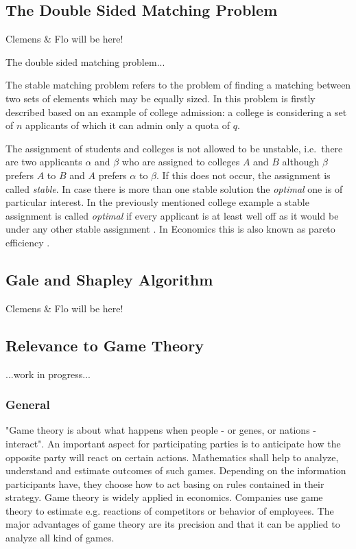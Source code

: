 \subsection{The Double Sided Matching Problem}
Clemens \& Flo will be here!

The double sided matching problem...

The stable matching problem refers to the problem of finding a matching between two sets of elements which may be equally sized. In \cite[p. 9]{gale62a} this problem is firstly described based on an example of college admission: a college is considering a set of $n$ applicants of which it can admin only a quota of $q$.

The assignment of students and colleges is not allowed to be unstable, i.e.\ there are two applicants $\alpha$ and $\beta$ who are assigned to colleges $A$ and $B$ although $\beta$ prefers $A$ to $B$ and $A$ prefers $\alpha$ to $\beta$. If this does not occur, the assignment is called \textit{stable}. In case there is more than one stable solution the \textit{optimal} one is of particular interest. In the previously mentioned college example a stable assignment is called \textit{optimal} if every applicant is at least well off as it would be under any other stable assignment \cite[p. 10]{gale62a}. In Economics this is also known as pareto efficiency \cite[p. 46]{9780199297818}.

\subsection{Gale and Shapley Algorithm}
Clemens \& Flo will be here!

\subsection{Relevance to Game Theory}
...work in progress...
\subsubsection{General}
"Game theory is about what happens when people - or genes, or nations - interact". An important aspect for participating parties is to anticipate how the opposite party will react on certain actions. Mathematics shall help to analyze, understand and estimate outcomes of such games. Depending on the information participants have, they choose how to act basing on rules contained in their strategy. Game theory is widely applied in economics. Companies use game theory to estimate e.g. reactions of competitors or behavior of employees. The major advantages of game theory are its precision and that it can be applied to analyze all kind of games. \cite[p. 1ff]{camerer2003behavioral}

